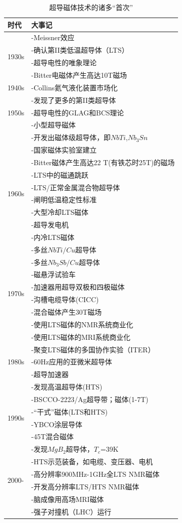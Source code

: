 \begin{table}[htbp]\small
  \centering
  \caption{超导磁体技术的诸多“首次”} \label{first event}

\begin{tabular}{ |l||l|}
\hline
时代 & 大事记  \\ \hline
\multirow{4}{*}{1930s} & -Meissner效应 \\
 & -确认第II类低温超导体（LTS）\\
 & -超导电性的唯象理论 \\
 & -Bitter电磁体产生高达10T磁场 \\
 \hline
 1940s & -Collins氦气液化装置市场化\\
 \hline
\multirow{3}{*}{1950s} & -发现了更多的第II类超导体 \\
 & -超导电性的GLAG和BCS理论\\
 & -小型超导磁体 \\
 \hline
 \multirow{10}{*}{1960s} & -开发出磁体级超导体，即$NbTi$,$Nb_3Sn$ \\
 & -国家磁体实验室建立\\
 & -Bitter磁体产生高达22 T(有铁芯时25T)的磁场\\
 & -LTS中的磁通跳跃\\
 & -LTS/正常金属混合物超导体\\
 & -阐明低温稳定性标准\\
 & -大型冷却LTS磁体\\
 & -超导发电机\\
 & -内冷LTS磁体\\
 & -多丝$NbTi/Cu$超导体\\
 \hline
 \multirow{6}{*}{1970s} & -多丝$Nb_3Sb/Cu$超导体 \\
 & -磁悬浮试验车\\
 & -加速器用超导双极和四极磁体 \\
 & -沟槽电缆导体(CICC)\\
 & -混合磁体产生30T磁场\\
 & -使用LTS磁体的NMR系统商业化\\
 \hline
  \multirow{5}{*}{1980s} & -使用LTS磁体的MRI系统商业化 \\
 & -聚变LTS磁体的多国协作实验（ITER）\\
 & -60Hz应用的亚微米超导体\\
 & -超导加速器\\
 & -发现高温超导体(HTS)\\
 \hline
   \multirow{4}{*}{1990s} & -BSCCO-2223/Ag超导带；磁体(1-7T) \\
 & -“干式”磁体(LTS和HTS)\\
 & -YBCO涂层导体\\
 & -45T混合磁体\\
 \hline
  \multirow{6}{*}{2000-} & -发现$MgB_2$超导体，$T_c$=39K \\
 & -HTS示范装备，如电缆、变压器、电机\\
 & -高分辨率900MHz-1GHz全LTS NMR磁体 \\
 & -开发高分辨率LTS/HTS NMR磁体\\
 & -脑成像用高场MRI磁体\\
 & -强子对撞机（LHC）运行\\
 \hline
\end{tabular}


\end{table}
